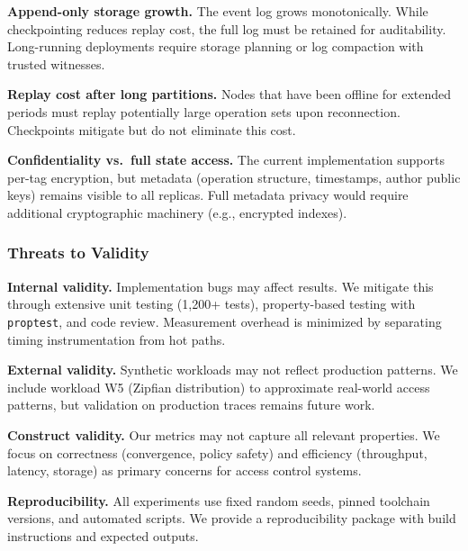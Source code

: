 \noindent\textbf{Append-only storage growth.} The event log grows monotonically. While checkpointing reduces replay cost, the full log must be retained for auditability. Long-running deployments require storage planning or log compaction with trusted witnesses.

\noindent\textbf{Replay cost after long partitions.} Nodes that have been offline for extended periods must replay potentially large operation sets upon reconnection. Checkpoints mitigate but do not eliminate this cost.

\noindent\textbf{Confidentiality vs.\ full state access.} The current implementation supports per-tag encryption, but metadata (operation structure, timestamps, author public keys) remains visible to all replicas. Full metadata privacy would require additional cryptographic machinery (e.g., encrypted indexes).

\subsubsection{Threats to Validity}

\noindent\textbf{Internal validity.} Implementation bugs may affect results. We mitigate this through extensive unit testing (1,200+ tests), property-based testing with \texttt{proptest}, and code review. Measurement overhead is minimized by separating timing instrumentation from hot paths.

\noindent\textbf{External validity.} Synthetic workloads may not reflect production patterns. We include workload W5 (Zipfian distribution) to approximate real-world access patterns, but validation on production traces remains future work.

\noindent\textbf{Construct validity.} Our metrics may not capture all relevant properties. We focus on correctness (convergence, policy safety) and efficiency (throughput, latency, storage) as primary concerns for access control systems.

\noindent\textbf{Reproducibility.} All experiments use fixed random seeds, pinned toolchain versions, and automated scripts. We provide a reproducibility package with build instructions and expected outputs.
